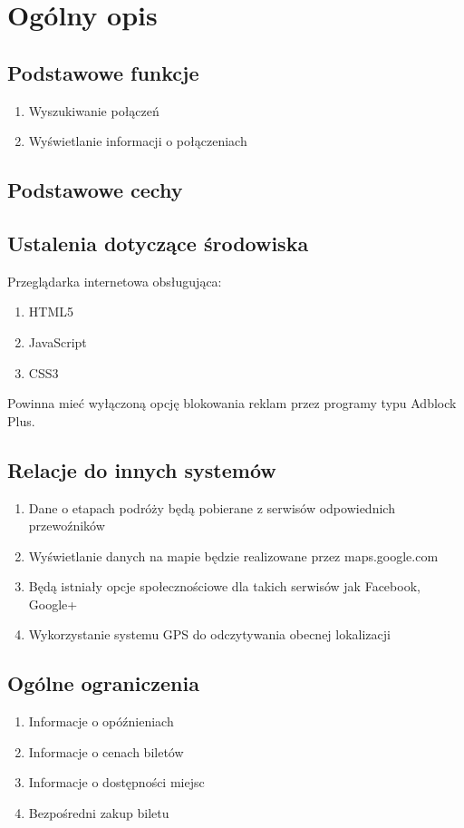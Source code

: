 \documentclass[12pt,a4paper]{report}
\begin{document}
\section{Ogólny opis}
\subsection{Podstawowe funkcje}
\begin{enumerate}
	\item Wyszukiwanie połączeń
	\item Wyświetlanie informacji o połączeniach
\end{enumerate}
\subsection{Podstawowe cechy}

\subsection{Ustalenia dotyczące środowiska}
	Przeglądarka internetowa obsługująca:
	\begin{enumerate}
		\item HTML5
		\item JavaScript
		\item CSS3
	\end{enumerate}
	Powinna mieć wyłączoną opcję blokowania reklam przez programy typu Adblock Plus.
\subsection{Relacje do innych systemów}
\begin{enumerate}
	\item Dane o etapach podróży będą pobierane z serwisów odpowiednich przewoźników
	\item Wyświetlanie danych na mapie będzie realizowane przez maps.google.com
	\item Będą istniały opcje społecznościowe dla takich serwisów jak Facebook, Google+
	\item Wykorzystanie systemu GPS do odczytywania obecnej lokalizacji
\end{enumerate}
\subsection{Ogólne ograniczenia}	
\begin{enumerate}
	\item Informacje o opóźnieniach
	\item Informacje o cenach biletów
	\item Informacje o dostępności miejsc
	\item Bezpośredni zakup biletu
\end{enumerate} 
\end{document}
